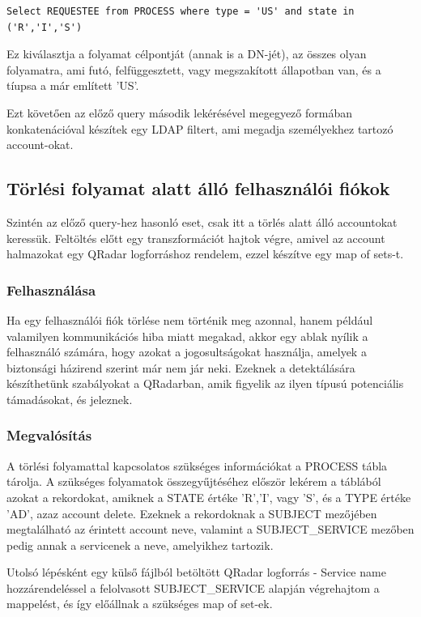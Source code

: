 		\begin{lstlisting}
Select REQUESTEE from PROCESS where type = 'US' and state in ('R','I','S')
\end{lstlisting}
		Ez kiválasztja a folyamat célpontját (annak is a DN-jét), az összes olyan folyamatra, ami futó, felfüggesztett, vagy megszakított állapotban van, és a tíupsa a már említett 'US'.
		
		Ezt követően az előző query második lekérésével megegyező formában konkatenációval készítek egy LDAP filtert, ami megadja személyekhez tartozó account-okat.
		
\subsection{Törlési folyamat alatt álló felhasználói fiókok} 
Szintén az előző query-hez hasonló eset, csak itt a törlés alatt álló accountokat keressük. Feltöltés előtt egy transzformációt hajtok végre, amivel az account halmazokat egy QRadar logforráshoz rendelem, ezzel készítve egy map of sets-t.  
	\subsubsection{Felhasználása}
		Ha egy felhasználói fiók törlése nem történik meg azonnal, 
		hanem például valamilyen kommunikációs hiba miatt megakad, akkor egy ablak nyílik a felhasználó számára, hogy azokat a jogosultságokat használja, amelyek a biztonsági házirend szerint már nem jár neki. Ezeknek a detektálására készíthetünk szabályokat a QRadarban, amik figyelik az ilyen típusú potenciális támadásokat, és jeleznek.
		 
	\subsubsection{Megvalósítás}
		A törlési folyamattal kapcsolatos szükséges információkat a PROCESS tábla tárolja. A szükséges folyamatok összegyűjtéséhez először lekérem a  táblából azokat a rekordokat, amiknek a STATE értéke 'R','I', vagy 'S', és a TYPE értéke 'AD', azaz account delete. Ezeknek a rekordoknak a SUBJECT mezőjében megtalálható az érintett account neve, valamint a SUBJECT\_SERVICE mezőben pedig annak a servicenek a neve, amelyikhez tartozik.
		
		Utolsó lépésként egy külső fájlból betöltött QRadar logforrás - Service name hozzárendeléssel a felolvasott SUBJECT\_SERVICE alapján végrehajtom a mappelést, és így előállnak a szükséges map of set-ek.
	
